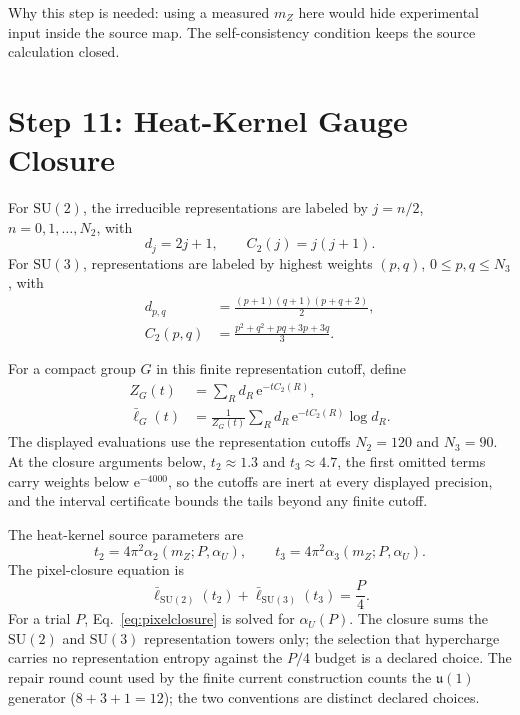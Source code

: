 \documentclass[11pt]{article}
\theoremstyle{remark}
\newcommand{\SU}{\mathrm{SU}}
\newcommand{\e}{\mathrm e}
\begin{document}
Why this step is needed: using a measured \(m_Z\) here would hide experimental input inside the source map. The self-consistency condition keeps the source calculation closed.

\section{Step 11: Heat-Kernel Gauge Closure}

For \(\SU(2)\), the irreducible representations are labeled by \(j=n/2\), \(n=0,1,\ldots,N_2\), with
\begin{equation}
d_j=2j+1,
\qquad
C_2(j)=j(j+1).
\label{eq:su2rep}
\end{equation}
For \(\SU(3)\), representations are labeled by highest weights \((p,q)\), \(0\le p,q\le N_3\), with
\begin{align}
d_{p,q}&=\frac{(p+1)(q+1)(p+q+2)}{2},
\label{eq:su3dim}\\
C_2(p,q)&=\frac{p^2+q^2+pq+3p+3q}{3}.
\label{eq:su3casimir}
\end{align}

For a compact group \(G\) in this finite representation cutoff, define
\begin{align}
Z_G(t)&=\sum_R d_R\,\e^{-tC_2(R)},\\
\bar\ell_G(t)&=
\frac{1}{Z_G(t)}
\sum_R d_R\,\e^{-tC_2(R)}\log d_R.
\label{eq:ellbar}
\end{align}
The displayed evaluations use the representation cutoffs \(N_2=120\) and
\(N_3=90\). At the closure arguments below, \(t_2\approx1.3\) and
\(t_3\approx4.7\), the first omitted terms carry weights below
\(\e^{-4000}\), so the cutoffs are inert at every displayed precision, and
the interval certificate bounds the tails beyond any finite cutoff.

The heat-kernel source parameters are
\begin{equation}
t_2=4\pi^2\alpha_2(m_Z;P,\alpha_U),
\qquad
t_3=4\pi^2\alpha_3(m_Z;P,\alpha_U).
\label{eq:t23}
\end{equation}
The pixel-closure equation is
\begin{equation}
\boxed{
\bar\ell_{\SU(2)}(t_2)+\bar\ell_{\SU(3)}(t_3)=\frac{P}{4}.
}
\label{eq:pixelclosure}
\end{equation}
For a trial \(P\), Eq.~\eqref{eq:pixelclosure} is solved for \(\alpha_U(P)\).
The closure sums the \(\SU(2)\) and \(\SU(3)\) representation towers only; the
selection that hypercharge carries no representation entropy against the
\(P/4\) budget is a declared choice. The repair round count used by the
finite current construction counts the \(\mathfrak u(1)\) generator
(\(8+3+1=12\)); the two
conventions are distinct declared choices.
\end{document}
